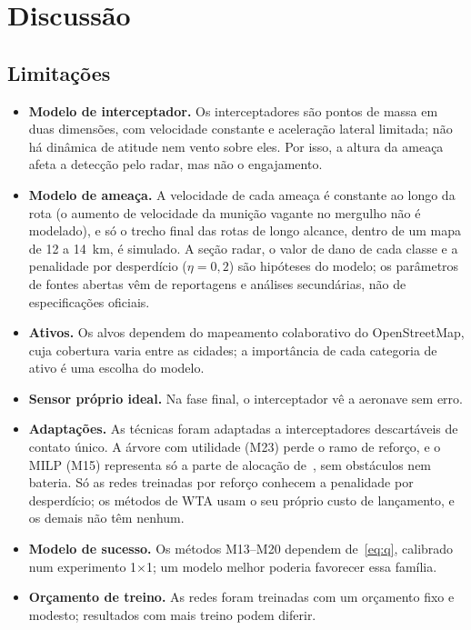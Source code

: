 \section{Discussão}\label{sec:discussao}

\subsection{Limitações}
\begin{itemize}
  \item \textbf{Modelo de interceptador.} Os interceptadores são pontos de massa em duas dimensões, com velocidade
        constante e aceleração lateral limitada; não há dinâmica de atitude nem vento sobre eles. Por isso, a altura da
        ameaça afeta a detecção pelo radar, mas não o engajamento.
  \item \textbf{Modelo de ameaça.} A velocidade de cada ameaça é constante ao longo da rota (o aumento de velocidade da
        munição vagante no mergulho não é modelado), e só o trecho final das rotas de longo alcance, dentro de um mapa de
        12 a 14~km, é simulado. A seção radar, o valor de dano de cada classe e a penalidade por desperdício
        ($\eta=0{,}2$) são hipóteses do modelo; os parâmetros de fontes abertas vêm de reportagens e análises
        secundárias, não de especificações oficiais.
  \item \textbf{Ativos.} Os alvos dependem do mapeamento colaborativo do OpenStreetMap, cuja cobertura varia entre as
        cidades; a importância de cada categoria de ativo é uma escolha do modelo.
  \item \textbf{Sensor próprio ideal.} Na fase final, o interceptador vê a aeronave sem erro.
  \item \textbf{Adaptações.} As técnicas foram adaptadas a interceptadores descartáveis de contato único. A árvore com
        utilidade (M23) perde o ramo de reforço, e o MILP (M15) representa só a parte de alocação de~\cite{cruz2025}, sem
        obstáculos nem bateria. Só as redes treinadas por reforço conhecem a penalidade por desperdício; os métodos de
        WTA usam o seu próprio custo de lançamento, e os demais não têm nenhum.
  \item \textbf{Modelo de sucesso.} Os métodos M13--M20 dependem de~\eqref{eq:q}, calibrado num experimento 1$\times$1; um
        modelo melhor poderia favorecer essa família.
  \item \textbf{Orçamento de treino.} As redes foram treinadas com um orçamento fixo e modesto; resultados com mais
        treino podem diferir.
\end{itemize}

